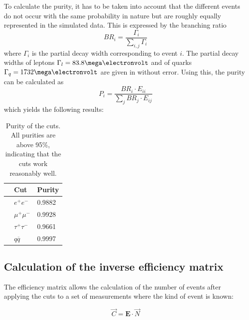 To calculate the purity, it has to be taken into account that the different events do not occur with the same probability in nature but are roughly equally represented in the simulated data. This is expressed by the branching ratio
\begin{equation}
BR_i=\frac{\Gamma_i}{\sum_{i,j}\Gamma_{i}}
\end{equation}
where $\Gamma_i$ is the partial decay width corresponding to event $i$. The partial decay widths of leptons $\Gamma_l=\unit{83.8}{\mega\electronvolt}$ and of quarks $\Gamma_q=\unit{1732}{\mega\electronvolt}$ are given in \cite{staatsex} without error.
Using this, the purity can be calculated as
\begin{equation}
P_i=\frac{BR_i\cdot E_{ii}}{\sum_{j}BR_j\cdot E_{ij}}
\end{equation}
which yields the following results:

\begin{table}[H]\centering
	\begin{tabular}{@{}lll@{}}
		\toprule
		&Cut&Purity\\
		\midrule
		&$e^+e^-$&0.9882\\
		&$\mu^+\mu^-$&0.9928\\
		&$\tau^+\tau^-$&0.9661\\
		&$q\overline{q}$&0.9997\\
		\bottomrule
	\end{tabular}
	\caption[Purity of the cuts]{Purity of the cuts. All purities are above 95\%, indicating that the cuts work reasonably well.}
	\label{tb:purity}
\end{table}

\subsection{Calculation of the inverse efficiency matrix}
The efficiency matrix allows the calculation of the number of events after applying the cuts to a set of measurements where the kind of event is known:

\begin{equation}
\vec{C}=\boldsymbol{E}\cdot\vec{N}
\end{equation} 

